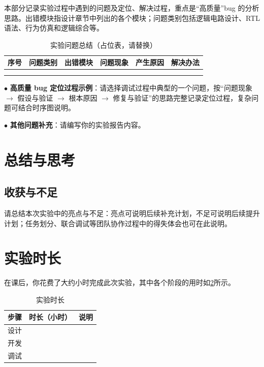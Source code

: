 \documentclass[11pt]{article}
\begin{document}
本部分记录实验过程中遇到的问题及定位、解决过程，重点是“高质量”bug 的分析思路。出错模块指设计章节中列出的各个模块；问题类别包括逻辑电路设计、RTL 语法、行为仿真和逻辑综合等。

\begin{table}[htbp]
  \centering
  \begin{tabular}{c|c|c|c|c|c}
    序号 & 问题类别 & 出错模块 & 问题现象 & 产生原因 & 解决办法 \\
    \hline
       &      &      &      &      &      \\
    \hline
       &      &      &      &      &      \\
  \end{tabular}
  \caption{实验问题总结（占位表，请替换）}
  \label{tab:problem}
\end{table}

\noindent
$\bullet$
\textbf{高质量 bug 定位过程示例}：请选择调试过程中典型的一个问题，按“问题现象 $\rightarrow$ 假设与验证 $\rightarrow$ 根本原因 $\rightarrow$ 修复与验证”的思路完整记录定位过程，复杂问题可结合时序图说明。

\vspace{1ex}

\noindent
$\bullet$
\textbf{其他问题补充}：请编写你的实验报告内容。

\section{总结与思考}

\subsection{收获与不足}

请总结本次实验中的亮点与不足：亮点可说明后续补充计划，不足可说明后续提升计划；任务划分、联合调试等团队协作过程中的得失体会也可在此说明。

\section{实验时长}

\newcommand{\labTime}{123} %

在课后，你花费了大约\underline{\makebox[5em][c]{\labTime}}小时完成此次实验，其中各个阶段的用时如\cref{tab:time_token}所示。

\begin{table}[htbp]
  \centering
  \begin{tabular}{c|c|c}
    步骤 & 时长（小时） & 说明 \\
    \hline
    设计 &        &    \\
    \hline
    开发 &        &    \\
    \hline
    调试 &        &    \\
  \end{tabular}
  \caption{实验时长}
  \label{tab:time_token}
\end{table}
\end{document}
